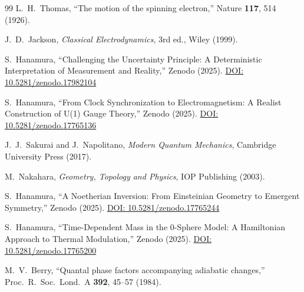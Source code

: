 \documentclass[%
 reprint,
 amsmath,amssymb,
 aps,
 prb,
]{revtex4-2}
\numberwithin{equation}{section}
\begin{document}
\begin{thebibliography}{99}
L.~H.~Thomas,
``The motion of the spinning electron,''
Nature \textbf{117}, 514 (1926).

J.~D.~Jackson,
\textit{Classical Electrodynamics},
3rd ed., Wiley (1999).

S.~Hanamura,
``Challenging the Uncertainty Principle: A Deterministic Interpretation of Measurement and Reality,''
Zenodo (2025).
\href{https://doi.org/10.5281/zenodo.17982104}{DOI: 10.5281/zenodo.17982104}

S.~Hanamura,
``From Clock Synchronization to Electromagnetism: A Realist Construction of U(1) Gauge Theory,''
Zenodo (2025).
\href{https://doi.org/10.5281/zenodo.17765136}{DOI: 10.5281/zenodo.17765136}

J.~J.~Sakurai and J.~Napolitano,
\textit{Modern Quantum Mechanics},
Cambridge University Press (2017).

M.~Nakahara,
\textit{Geometry, Topology and Physics},
IOP Publishing (2003).

S.~Hanamura,
``A Noetherian Inversion: From Einsteinian Geometry to Emergent Symmetry,''
Zenodo (2025).
\href{https://doi.org/10.5281/zenodo.17765244}{DOI: 10.5281/zenodo.17765244}

S.~Hanamura,
``Time-Dependent Mass in the 0-Sphere Model: A Hamiltonian Approach to Thermal Modulation,''
Zenodo (2025).
\href{https://doi.org/10.5281/zenodo.17765200}{DOI: 10.5281/zenodo.17765200}

M.~V.~Berry,
``Quantal phase factors accompanying adiabatic changes,''
Proc.\ R.\ Soc.\ Lond.\ A {\bf 392}, 45--57 (1984).

\end{thebibliography}

\end{document}
